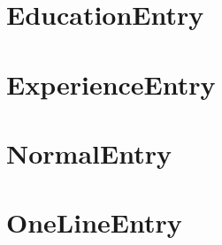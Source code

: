 \documentclass[10pt, a4paper]{memoir}
\begin{document}
    \section{EducationEntry}
    \section{ExperienceEntry}
    \section{NormalEntry}
    \section{OneLineEntry}
\end{document}
